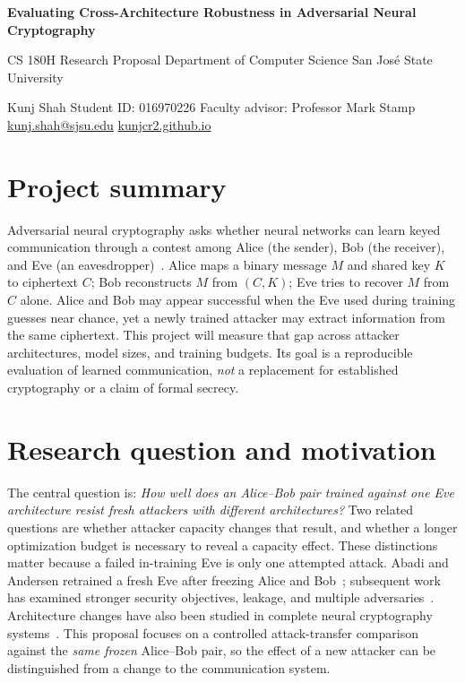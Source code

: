 \documentclass[10pt,letterpaper]{article}
\begin{document}
\begin{center}
  {\Large\bfseries Evaluating Cross-Architecture Robustness in Adversarial Neural Cryptography\par}
  \vspace{5pt}
  {\normalsize CS 180H Research Proposal \textbar{} Department of Computer Science \textbar{} San Jos\'e State University\par}
  \vspace{4pt}
  Kunj Shah \textbar{} Student ID: 016970226 \textbar{} Faculty advisor: Professor Mark Stamp\\
  \href{mailto:kunj.shah@sjsu.edu}{kunj.shah@sjsu.edu} \textbar{}
  \href{https://kunjcr2.github.io}{kunjcr2.github.io}
\end{center}

\vspace{-5pt}
\section{Project summary}
Adversarial neural cryptography asks whether neural networks can learn keyed communication through a contest among Alice (the sender), Bob (the receiver), and Eve (an eavesdropper)~\cite{abadi2016}. Alice maps a binary message $M$ and shared key $K$ to ciphertext $C$; Bob reconstructs $M$ from $(C,K)$; Eve tries to recover $M$ from $C$ alone. Alice and Bob may appear successful when the Eve used during training guesses near chance, yet a newly trained attacker may extract information from the same ciphertext. This project will measure that gap across attacker architectures, model sizes, and training budgets. Its goal is a reproducible evaluation of learned communication, \emph{not} a replacement for established cryptography or a claim of formal secrecy.

\section{Research question and motivation}
The central question is: \emph{How well does an Alice--Bob pair trained against one Eve architecture resist fresh attackers with different architectures?} Two related questions are whether attacker capacity changes that result, and whether a longer optimization budget is necessary to reveal a capacity effect. These distinctions matter because a failed in-training Eve is only one attempted attack. Abadi and Andersen retrained a fresh Eve after freezing Alice and Bob~\cite{abadi2016}; subsequent work has examined stronger security objectives, leakage, and multiple adversaries~\cite{coutinho2018,zhou2019,li2020}. Architecture changes have also been studied in complete neural cryptography systems~\cite{tyler2025}. This proposal focuses on a controlled attack-transfer comparison against the \emph{same frozen} Alice--Bob pair, so the effect of a new attacker can be distinguished from a change to the communication system.
\end{document}
